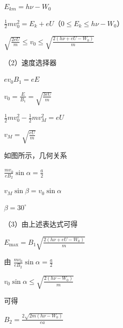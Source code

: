 \documentclass[\gkver]{gaokaozhenti}
\begin{document}
\begin{enumerate}
{	$E_{km}=h\nu-W_{0}$

	$\frac{1}{2}mv_{0}^{2}=E_{k}+eU$（$0\leq E_{k}\leq h\nu-W_{0}$）

	$\sqrt{\frac{2eU}{m}}\leq v_{0}\leq\sqrt{\frac{2(h\nu+eU-W_{0})}{m}}$

	（2）速度选择器

	$ev_{0}B_{1}=eE$

	$v_{0}=\frac{E}{B_{1}}=\sqrt{\frac{3eU}{m}}$

	$\frac{1}{2}mv_{0}^{2}-\frac{1}{2}mv_{M}^{2}=eU$

	$v_{M}=\sqrt{\frac{eU}{m}}$

	如图所示，几何关系


	$\frac{mv_{0}}{eB_{2}}\sin\alpha=\frac{a}{2}$

	$v_{M}\sin\beta=v_{0}\sin\alpha$

	$\beta=30^{\circ}$

	（3）由上述表达式可得

	$E_{\max}=B_{1}\sqrt{\frac{2(h\nu+eU-W_{0})}{m}}$

	由 $\frac{mv_{0}}{eB_{2}}\sin\alpha=\frac{a}{2}$

	$v_{0}\sin\alpha\leq\sqrt{\frac{2(h\nu-W_{0})}{m}}$

	可得

	$B_{2}=\frac{2\sqrt{2m(h\nu-W_{0})}}{ea}$
}

\end{enumerate}
\end{document}
